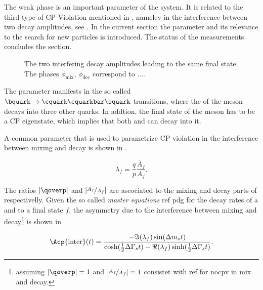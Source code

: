 The weak phase \phis is an important parameter of the \BBbarSyst system. It is related to the third
type of CP-Violation mentioned in , nameley in the interference between
two decay amplitudes, see . In the current section the parameter \phis
and its relevance to the search for new particles is introduced. The status of the \phis
measurements concludes the section.

\newcommand{\ffig}{f}
\newcommand{\phimixfig}{\phi_\text{mix}}
\newcommand{\phifig}{\phi_\text{dec}}
\newcommand{\phibarfig}{\kern 0.15em \overline{\kern -0.15em \phi_\text{dec} \kern -0.60em} \kern 0.60em}
\begin{figure}[h]
  \centering
  \resizebox{0.4\textwidth}{!}{}
  \caption{The two interfering decay amplitudes leading to the same final state.
           The phases $\phimixfig$, $\phifig$ correspond to ....
           }
  \label{interference}
\end{figure}

The parameter \phis manifests in the so called $\bquark \rightarrow \cquark\cquarkbar\squark $ transitions, where the
\bquark of the \Bs meson decays into three other quarks. In addtion, the final state of the \Bs meson has to be a CP eigenstate,
which implies that both \Bs and \Bsb can decay into it.

A common parameter that is used to parametrize CP violation in the interference between mixing and decay is shown in .

\begin{equation}
 \lambda_{f} = \frac{q}{p} \frac{\bar{A}_f}{A_f}. %
\label{lambda_cpv}
\end{equation}

\noindent The ratios $|\qoverp|$ and $|\nicefrac{A_f}{\bar{A}_{f}}|$ are ascociated to the mixing and decay parts of  respectivelly.
Given the so called {\it master equations}{\color{red} ref pdg} for the decay rates of a \Bs and \Bsb
to a final state $f$, the asymmetry due to the interference between mixing and decay\footnote{assuming $|\qoverp|=1$ and $|\nicefrac{A_f}{\bar{A}_{\bar{f}}}| = 1$ consistet with {\color{red} ref for nocpv in mix and decay}.}
is shown in 

\newcommand{\half}{\frac{1}{2}}
\begin{equation}
  \Acp{\text{inter}}(t) = \frac{ - \Im(\lambda_f) \sin(\Delta m_s t)} {\cosh(\half \Delta\Gamma_s t) - \Re(\lambda_f)\sinh(\half\Delta\Gamma_s t)}.
\label{cpv_interf}
\end{equation}

